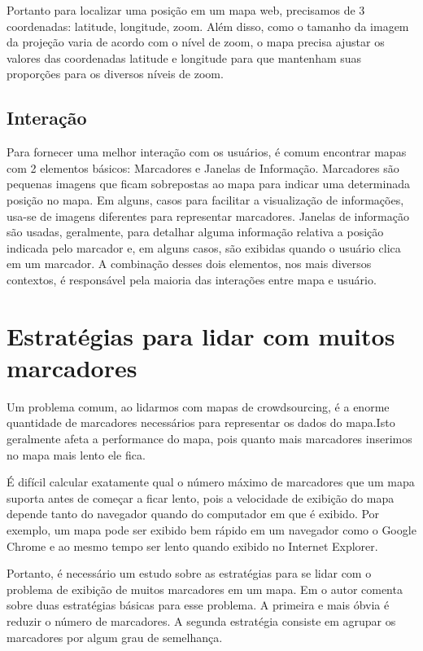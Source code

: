 	Portanto para localizar uma posição  em um mapa web, precisamos de 3 coordenadas: latitude, longitude, zoom. Além disso, como o tamanho da imagem da projeção varia de acordo com o nível de zoom, o mapa precisa ajustar os valores das coordenadas latitude e longitude para que mantenham suas proporções para os diversos níveis de zoom.

	\subsection{Interação}
	Para fornecer uma melhor interação com os usuários, é comum encontrar mapas com 2 elementos básicos: Marcadores e Janelas de Informação.
	Marcadores são pequenas imagens que ficam sobrepostas ao mapa para indicar uma determinada posição no mapa. Em alguns, casos para facilitar a visualização de informações, usa-se de imagens diferentes para representar marcadores.
	Janelas de informação são usadas, geralmente, para detalhar alguma informação relativa a posição indicada pelo marcador e, em alguns casos, são exibidas quando o usuário clica em um marcador.
	A combinação desses dois elementos, nos mais diversos contextos, é responsável pela maioria das interações entre mapa e usuário.

\section{Estratégias para lidar com muitos marcadores}
	Um problema comum, ao lidarmos com mapas de crowdsourcing, é a enorme quantidade de marcadores necessários para representar os dados do mapa.Isto geralmente afeta a performance do mapa, pois quanto mais marcadores inserimos no mapa mais lento ele fica. 
	
	É difícil calcular exatamente qual o número máximo de marcadores que um mapa suporta antes de começar a ficar lento, pois a velocidade de exibição do mapa depende tanto do navegador quando do computador em que é exibido. Por exemplo, um mapa pode ser exibido bem rápido em um navegador como o Google Chrome e ao mesmo tempo ser lento quando exibido no Internet Explorer.\cite[177]{livroGoogleApiV3}
	
    Portanto, é necessário um estudo sobre as  estratégias para se lidar com o problema de exibição de muitos marcadores em um mapa. Em \cite[capítulo~9]{livroGoogleApiV3} o autor comenta sobre duas estratégias básicas para esse problema. A primeira e mais óbvia é reduzir o número de marcadores. A segunda estratégia consiste em agrupar os marcadores por algum grau de semelhança.
    
